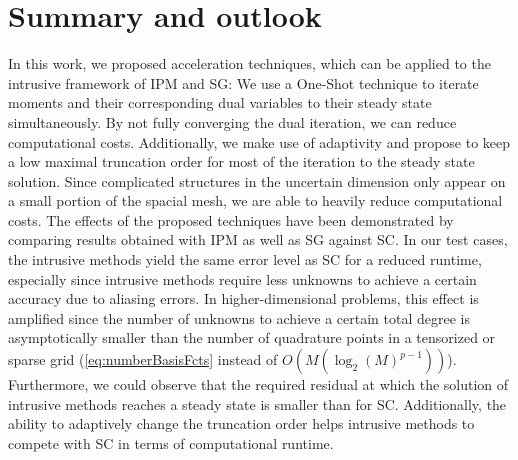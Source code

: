 \section{Summary and outlook}
\label{sec:summary_outlook}
In this work, we proposed acceleration techniques, which can be applied to the intrusive framework of IPM and SG: We use a One-Shot technique to iterate moments and their corresponding dual variables to their steady state simultaneously. By not fully converging the dual iteration, we can reduce computational costs. Additionally, we make use of adaptivity and propose to keep a low maximal truncation order for most of the iteration to the steady state solution. Since complicated structures in the uncertain dimension only appear on a small portion of the spacial mesh, we are able to heavily reduce computational costs. The effects of the proposed techniques have been demonstrated by comparing results obtained with IPM as well as SG against SC. In our test cases, the intrusive methods yield the same error level as SC for a reduced runtime, especially since intrusive methods require less unknowns to achieve a certain accuracy due to aliasing errors. In higher-dimensional problems, this effect is amplified since the number of unknowns to achieve a certain total degree is asymptotically smaller than the number of quadrature points in a tensorized or sparse grid (\eqref{eq:numberBasisFcts} instead of $O(M(\log_2(M)^{p-1}))$). Furthermore, we could observe that the required residual at which the solution of intrusive methods reaches a steady state is smaller than for SC. Additionally, the ability to adaptively change the truncation order helps intrusive methods to compete with SC in terms of computational runtime.

